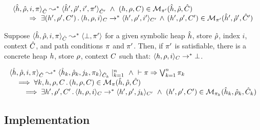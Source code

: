 \begin{theorem}\label{teo:soundness:jsil:symb:exe}
$$
\begin{array}{l}
\symbtranstrans{\sheap, \sstore, i, \pc}{\sheap', \sstore', i', \pc'}[\sctx][\sctx'] 
   \ \wedge \ 
      (\heap, \store, \ctx) \in \smodels{\sheap, \sstore, \sctx}{\pc'} \\ \quad \quad
      	 \ \Rightarrow \ \exists (\heap', \store', \ctx') \, . \, 
	 	 \semtranstrans{\heap, \store, i}{\heap', \store', i'}[\ctx][\ctx']
		\, \wedge \, 
		(\heap', \store', \ctx') \in \smodels{\sheap', \sstore', \sctx'}{\pc'}  
\end{array}
$$
\end{theorem}

\begin{corollary}
Suppose $\langle \hat{h}, \hat\rho, i, \pi \rangle_{\hat{C}} \leadsto^* \langle \bot, \pi' \rangle$ for 
a given symbolic heap $\hat{h}$, store $\hat\rho$, index $i$, context $\hat{C}$, and path 
conditions $\pi$ and $\pi'$. Then, if $\pi'$ is satisfiable, there is a concrete heap 
$h$, store $\rho$, context $C$ such that: 
$\semtranstranserr{\heap, \store, i}[\ctx]$.
\end{corollary}

\begin{corollary}[Verification]
$$
\begin{array}{l}
   \symbtranstrans{\sheap, \sstore, i, \pc}{\sheap_k, \sstore_k, j_k, \pc_k}[\sctx][\sctx_k]\mid_{k = 1}^n
      \ \wedge \ \vdash \pc \Rightarrow \bigvee_{k=1}^n \pc_k \\ 
      \quad \implies 
         \forall k, \heap, \store, \ctx \, . \, (\heap, \store, \ctx) \in \smodels{\sheap, \sstore, \sctx}{\pc} \\
          \qquad \implies \exists \heap', \store', \ctx' \, . \, 
                  \semtranstrans{\heap, \store, i}{\heap', \store', j_k}[\ctx][\ctx'] \ \wedge \ 
                  (\heap', \store', \ctx') \in \smodels{\sheap_k, \sstore_k, \sctx_k}{\pc_k}
\end{array}   
$$ 
\end{corollary}



\subsection{Implementation}


